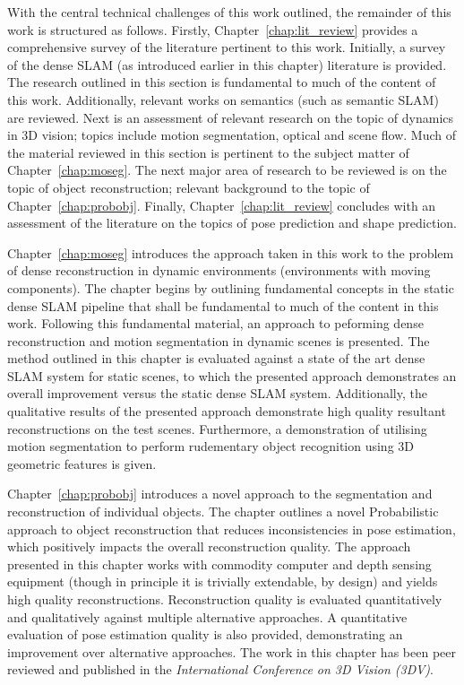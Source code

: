 With the central technical challenges of this work outlined, the remainder of this work is structured 
as follows. Firstly, Chapter~\ref{chap:lit_review} provides a comprehensive survey of the literature 
pertinent to this work. Initially, a survey of the dense SLAM (as introduced earlier in this chapter) 
literature is provided. The research outlined in this section is fundamental to much of the content of 
this work. Additionally, relevant works on semantics (such as semantic SLAM) are reviewed. 
Next is an assessment of relevant research on the topic of dynamics in 3D vision; topics include motion 
segmentation, optical and scene flow. Much of the material reviewed in this section is pertinent to the 
subject matter of Chapter~\ref{chap:moseg}. The next major area of research to be reviewed is on the topic 
of object reconstruction; relevant background to the topic of Chapter~\ref{chap:probobj}. Finally, 
Chapter~\ref{chap:lit_review} concludes with an assessment of the literature on the topics of pose prediction 
and shape prediction.

Chapter~\ref{chap:moseg} introduces the approach taken in this work to the problem of dense reconstruction 
in dynamic environments (environments with moving components). The chapter begins by outlining fundamental 
concepts in the static dense SLAM pipeline that shall be fundamental to much of the content in this work. 
Following this fundamental material, an approach to peforming dense reconstruction and motion segmentation 
in dynamic scenes is presented. The method outlined in this chapter is evaluated against a state of the art 
dense SLAM system for static scenes, to which the presented approach demonstrates an overall improvement 
versus the static dense SLAM system. Additionally, the qualitative results of the presented approach 
demonstrate high quality resultant reconstructions on the test scenes. Furthermore, a demonstration of 
utilising motion segmentation to perform rudementary object recognition using 3D geometric features is 
given.

Chapter~\ref{chap:probobj} introduces a novel approach to the segmentation and reconstruction of individual 
objects. The chapter outlines a novel Probabilistic approach to object reconstruction that reduces 
inconsistencies in pose estimation, which positively impacts the overall reconstruction quality. The 
approach presented in this chapter works with commodity computer and depth sensing equipment (though in 
principle it is trivially extendable, by design) and yields high quality reconstructions. Reconstruction 
quality is evaluated quantitatively and qualitatively against multiple alternative approaches. A 
quantitative evaluation of pose estimation quality is also provided, demonstrating an improvement over 
alternative approaches. The work in this chapter has been peer reviewed and published in the 
\textit{International Conference on 3D Vision (3DV)}.

